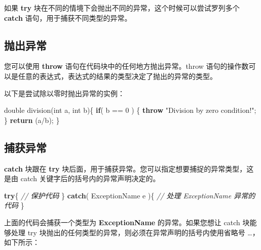 \documentclass[
]{article}
\newenvironment{Shaded}{}{}
\newcommand{\CommentTok}[1]{\textcolor[rgb]{0.38,0.63,0.69}{\textit{#1}}}
\newcommand{\ControlFlowTok}[1]{\textcolor[rgb]{0.00,0.44,0.13}{\textbf{#1}}}
\newcommand{\DataTypeTok}[1]{\textcolor[rgb]{0.56,0.13,0.00}{#1}}
\newcommand{\DecValTok}[1]{\textcolor[rgb]{0.25,0.63,0.44}{#1}}
\newcommand{\NormalTok}[1]{#1}
\newcommand{\OperatorTok}[1]{\textcolor[rgb]{0.40,0.40,0.40}{#1}}
\newcommand{\StringTok}[1]{\textcolor[rgb]{0.25,0.44,0.63}{#1}}
\begin{document}
如果 \textbf{try}
块在不同的情境下会抛出不同的异常，这个时候可以尝试罗列多个
\textbf{catch} 语句，用于捕获不同类型的异常。

\hypertarget{ux629bux51faux5f02ux5e38}{%
\subsection{抛出异常}\label{ux629bux51faux5f02ux5e38}}

您可以使用 \textbf{throw} 语句在代码块中的任何地方抛出异常。throw
语句的操作数可以是任意的表达式，表达式的结果的类型决定了抛出的异常的类型。

以下是尝试除以零时抛出异常的实例：

\begin{Shaded}
\begin{Highlighting}[]
\DataTypeTok{double}\NormalTok{ division}\OperatorTok{(}\DataTypeTok{int}\NormalTok{ a}\OperatorTok{,} \DataTypeTok{int}\NormalTok{ b}\OperatorTok{)\{}
   \ControlFlowTok{if}\OperatorTok{(}\NormalTok{ b }\OperatorTok{==} \DecValTok{0} \OperatorTok{)}
   \OperatorTok{\{}
      \ControlFlowTok{throw} \StringTok{"Division by zero condition!"}\OperatorTok{;}
   \OperatorTok{\}}
   \ControlFlowTok{return} \OperatorTok{(}\NormalTok{a}\OperatorTok{/}\NormalTok{b}\OperatorTok{);}
\OperatorTok{\}}
\end{Highlighting}
\end{Shaded}

\hypertarget{ux6355ux83b7ux5f02ux5e38}{%
\subsection{捕获异常}\label{ux6355ux83b7ux5f02ux5e38}}

\textbf{catch} 块跟在 \textbf{try}
块后面，用于捕获异常。您可以指定想要捕捉的异常类型，这是由 catch
关键字后的括号内的异常声明决定的。

\begin{Shaded}
\begin{Highlighting}[]
\ControlFlowTok{try}\OperatorTok{\{}
   \CommentTok{// 保护代码}
\OperatorTok{\}}
\ControlFlowTok{catch}\OperatorTok{(}\NormalTok{ ExceptionName e }\OperatorTok{)\{}
  \CommentTok{// 处理 ExceptionName 异常的代码}
\OperatorTok{\}}
\end{Highlighting}
\end{Shaded}

上面的代码会捕获一个类型为 \textbf{ExceptionName} 的异常。如果您想让
catch 块能够处理 try
块抛出的任何类型的异常，则必须在异常声明的括号内使用省略号
\ldots，如下所示：
\end{document}
